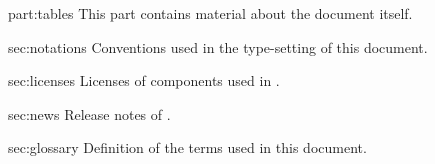 
\begin{partDescription}{part:tables}
  {
    This part contains material about the document itself.
  }
\item[sec:notations]
  Conventions used in the type-setting of this document.

\item[sec:licenses]
  Licenses of components used in \usdk.

\item[sec:news]
  Release notes of \usdk.

\item[sec:glossary]
  Definition of the terms used in this document.

\end{partDescription}


